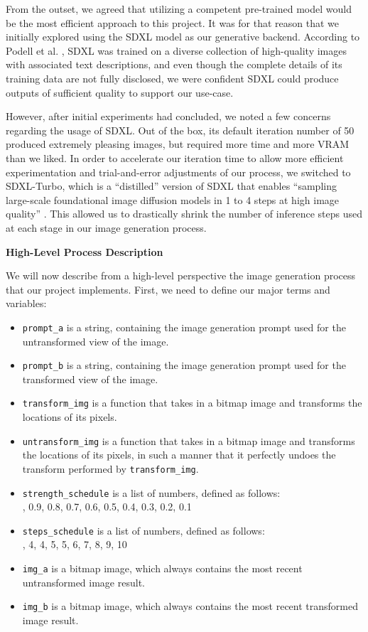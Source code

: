 \documentclass[12pt,letterpaper]{article}
\begin{document}
    From the outset, we agreed that utilizing a competent pre-trained model would be the most efficient approach to this project. It was for that reason that we initially explored using the SDXL model as our generative backend. According to Podell et al. \cite{sdxl}, SDXL was trained on a diverse collection of high-quality images with associated text descriptions, and even though the complete details of its training data are not fully disclosed, we were confident SDXL could produce outputs of sufficient quality to support our use-case.\setlength{\parskip}{12pt}

    However, after initial experiments had concluded, we noted a few concerns regarding the usage of SDXL. Out of the box, its default iteration number of 50 produced extremely pleasing images, but required more time and more VRAM than we liked. In order to accelerate our iteration time to allow more efficient experimentation and trial-and-error adjustments of our process, we switched to SDXL-Turbo, which is a ``distilled'' version of SDXL that enables ``sampling large-scale foundational image diffusion models in 1 to 4 steps at high image quality'' \cite{sdxl_turbo}. This allowed us to drastically shrink the number of inference steps used at each stage in our image generation process.

    \newpage
    \noindent\textbf{High-Level Process Description}\setlength{\parskip}{0pt}

    We will now describe from a high-level perspective the image generation process that our project implements. First, we need to define our major terms and variables:
    \begin{itemize}
        \setlength{\itemsep}{0pt}
        \item \texttt{prompt\_a} is a string, containing the image generation prompt used for the untransformed view of the image.
        \item \texttt{prompt\_b} is a string, containing the image generation prompt used for the transformed view of the image.
        \item \texttt{transform\_img} is a function that takes in a bitmap image and transforms the locations of its pixels.
        \item \texttt{untransform\_img} is a function that takes in a bitmap image and transforms the locations of its pixels, in such a manner that it perfectly undoes the transform performed by \texttt{transform\_img}.
        \item \texttt{strength\_schedule} is a list of numbers, defined as follows:\\, 0.9, 0.8, 0.7, 0.6, 0.5, 0.4, 0.3, 0.2, 0.1\rbrack
        \item \texttt{steps\_schedule} is a list of numbers, defined as follows:\\, 4, 4, 5, 5, 6, 7, 8, 9, 10\rbrack
        \item \texttt{img\_a} is a bitmap image, which always contains the most recent untransformed image result.
        \item \texttt{img\_b} is a bitmap image, which always contains the most recent transformed image result.
    \end{itemize}
\end{document}
